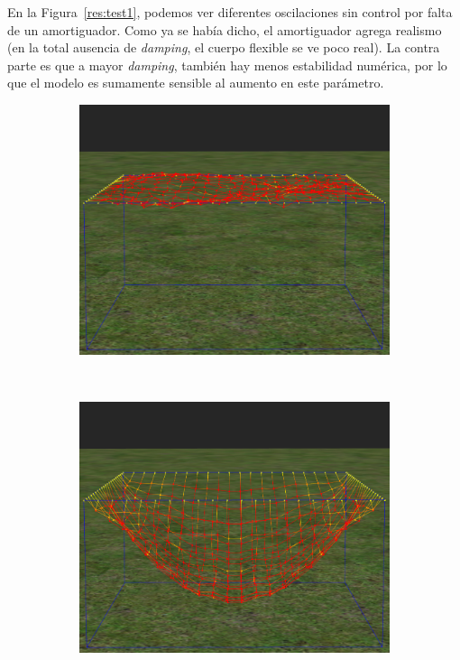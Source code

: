 En la Figura~\ref{res:test1}, podemos ver diferentes oscilaciones sin control por falta de un amortiguador.
Como ya se había dicho, el amortiguador agrega realismo (en la total ausencia de \emph{\textenglish{damping}}, el cuerpo flexible se ve poco real). La contra parte es que a mayor \emph{\textenglish{damping}}, también hay menos estabilidad numérica, por lo que el modelo es sumamente sensible al aumento en este parámetro.

\begin{figure}
 \centering
  \begin{subfigure}[b]{0.30\textwidth}
    \includegraphics[width=\textwidth]{Img/04/noDamp1}
  \end{subfigure}
~
  \begin{subfigure}[b]{0.30\textwidth}
    \includegraphics[width=\textwidth]{Img/04/noDamp2}

\end{subfigure}
\end{figure}

